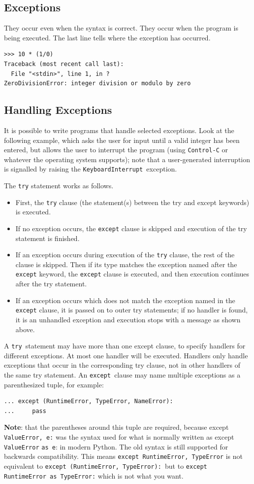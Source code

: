 \documentclass[12pt,a4paper]{article}
\begin{document}
\subsection{Exceptions}
They occur even when the syntax is correct. They occur when the program is being executed. The last line tells where the exception has occurred. 
\begin{verbatim}
>>> 10 * (1/0)
Traceback (most recent call last):
  File "<stdin>", line 1, in ?
ZeroDivisionError: integer division or modulo by zero
\end{verbatim}
\subsection{Handling Exceptions}
It is possible to write programs that handle selected exceptions. Look at the following example, which asks the user for input until a valid integer has been entered, but allows the user to interrupt the program (using \texttt{Control-C} or whatever the operating system supports); note that a user-generated interruption is signalled by raising the \texttt{KeyboardInterrupt }exception.

The \texttt{try} statement works as follows.
\begin{itemize}
\item First, the \texttt{try} clause (the statement(s) between the try and except keywords) is executed. 
\item If no exception occurs, the \texttt{except} clause is skipped and execution of the try statement is finished. 
\item If an exception occurs during execution of the \texttt{try} clause, the rest of the clause is skipped. Then if its type matches the exception named after the \texttt{except} keyword, the \texttt{except} clause is executed, and then execution continues after the try statement. 
\item If an exception occurs which does not match the exception named in the \texttt{except} clause, it is passed on to outer try statements; if no handler is found, it is an unhandled exception and execution stops with a message as shown above. 
\end{itemize}
A \texttt{try }statement may have more than one except clause, to specify handlers for different exceptions. At most one handler will be executed. Handlers only handle exceptions that occur in the corresponding try clause, not in other handlers of the same try statement. An \texttt{except }clause may name multiple exceptions as a parenthesized tuple, for example:
\begin{verbatim}
... except (RuntimeError, TypeError, NameError):
...     pass
\end{verbatim}
\textbf{Note}: that the parentheses around this tuple are required, because except \texttt{ValueError, e:} was the syntax used for what is normally written as except \texttt{ValueError} \texttt{as e}: in modern Python. The old syntax is still supported for backwards compatibility. This means \texttt{except RuntimeError, TypeError} is not equivalent to \texttt{except (RuntimeError, TypeError): }but to \texttt{except RuntimeError as TypeError:} which is not what you want.
\end{document}
